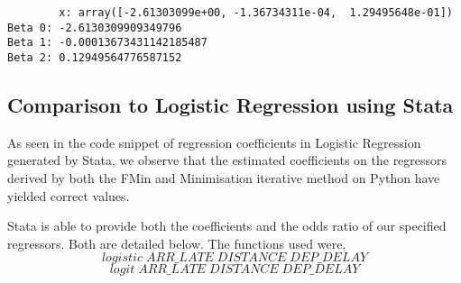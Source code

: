 \documentclass{article}
\begin{document}
\begin{lstlisting}
        x: array([-2.61303099e+00, -1.36734311e-04,  1.29495648e-01])
Beta 0: -2.6130309909349796
Beta 1: -0.00013673431142185487
Beta 2: 0.12949564776587152
\end{lstlisting}

\subsection{Comparison to Logistic Regression using Stata}
As seen in the code snippet of regression coefficients in Logistic Regression generated by Stata, we observe that the estimated coefficients on the regressors derived by both the FMin and Minimisation iterative method on Python have yielded correct values.

Stata is able to provide both the coefficients and the odds ratio of our specified regressors. Both are detailed below. The functions used were,$$logistic\;ARR\_LATE\;DISTANCE\;DEP\_DELAY$$ $$logit\;ARR\_LATE\;DISTANCE\;DEP\_DELAY$$
\end{document}
